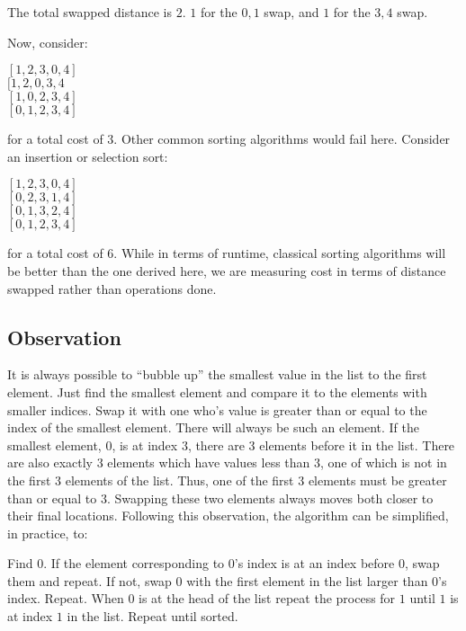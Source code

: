 \documentclass[11pt, oneside]{article}   	%
\begin{document}
The total swapped distance is $2$. $1$ for the $0, 1$ swap, and $1$ for the $3, 4$ swap.

Now, consider:

\begin{center}
$[1, 2, 3, 0, 4]$\\
$[1, 2, 0, 3, 4$\\
$[1, 0, 2, 3, 4]$\\
$[0, 1, 2, 3, 4]$
\end{center}

for a total cost of $3$. Other common sorting algorithms would fail here. Consider an insertion or selection sort:

\begin{center}
$[1, 2, 3, 0, 4]$\\
$[0, 2, 3, 1, 4]$\\
$[0, 1, 3, 2, 4]$\\
$[0, 1, 2, 3, 4]$
\end{center}

for a total cost of 6. While in terms of runtime, classical sorting algorithms will be better than the one derived here, we are measuring cost in terms of distance swapped rather than operations done.

\subsection{Observation}
It is always possible to ``bubble up'' the smallest value in the list to the first element. Just find the smallest element and compare it to the elements with smaller indices. Swap it with one who's value is greater than or equal to the index of the smallest element. There will always be such an element. If the smallest element, $0$, is at index $3$, there are $3$ elements before it in the list. There are also exactly $3$ elements which have values less than $3$, one of which is not in the first $3$ elements of the list. Thus, one of the first $3$ elements must be greater than or equal to $3$. Swapping these two elements always moves both closer to their final locations. Following this observation, the algorithm can be simplified, in practice, to:

Find $0$. If the element corresponding to $0$'s index is at an index before $0$, swap them and repeat. If not, swap $0$ with the first element in the list larger than $0$'s index. Repeat. When $0$ is at the head of the list repeat the process for $1$ until $1$ is at index $1$ in the list. Repeat until sorted. 
\end{document}
